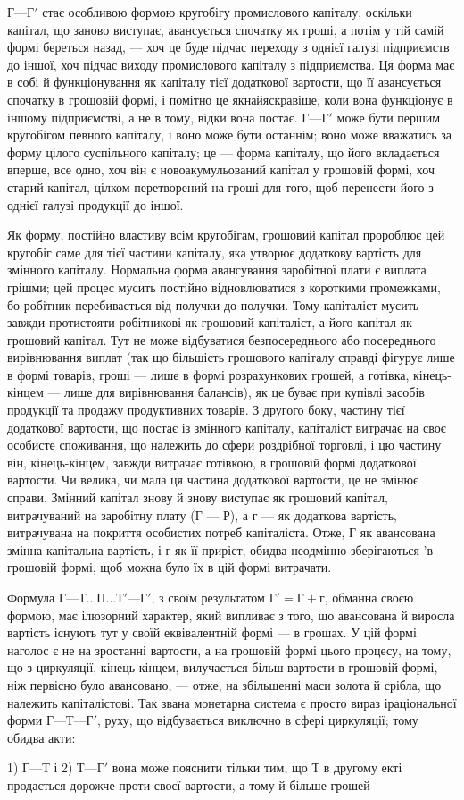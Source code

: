 $Г — Г'$ стає особливою формою кругобігу промислового капіталу,
оскільки капітал, що заново виступає, авансується спочатку як гроші, а потім
у тій самій формі береться назад, — хоч це буде підчас переходу з однієї
галузі підприємств до іншої, хоч підчас виходу промислового капіталу
з підприємства. Ця форма має в собі й функціонування як капіталу
тієї додаткової вартости, що її авансується спочатку в грошовій формі,
і помітно це якнайяскравіше, коли вона функціонує в іншому підприємстві,
а не в тому, відки вона постає. $Г — Г'$ може бути першим кругобігом
певного капіталу, і воно може бути останнім; воно може вважатись за
форму цілого суспільного капіталу; це — форма капіталу, що його вкладається
вперше, все одно, хоч він є новоакумульований капітал у грошовій
формі, хоч старий капітал, цілком перетворений на гроші для того,
щоб перенести його з однієї галузі продукції до іншої.

Як форму, постійно властиву всім кругобігам, грошовий капітал пророблює
цей кругобіг саме для тієї частини капіталу, яка утворює додаткову
вартість для змінного капіталу. Нормальна форма авансування
заробітної плати є виплата грішми; цей процес мусить постійно відновлюватися
з короткими промежками, бо робітник перебивається від
получки до получки. Тому капіталіст мусить завжди протистояти робітникові
як грошовий капіталіст, а його капітал як грошовий капітал. Тут
не може відбуватися безпосереднього або посереднього вирівнювання
виплат (так що більшість грошового капіталу справді фігурує лише
в формі товарів, гроші — лише в формі розрахункових грошей, а готівка,
кінець-кінцем — лише для вирівнювання балансів), як це буває при купівлі
засобів продукції та продажу продуктивних товарів. З другого боку,
частину тієї додаткової вартости, що постає із змінного капіталу, капіталіст
витрачає на своє особисте споживання, що належить до сфери
роздрібної торговлі, і цю частину він, кінець-кінцем, завжди витрачає
готівкою, в грошовій формі додаткової вартости. Чи велика, чи мала ця
частина додаткової вартости, це не змінює справи. Змінний капітал
знову й знову виступає як грошовий капітал, витрачуваний на заробітну
плату (Г — Р), а г — як додаткова вартість, витрачувана на покриття
особистих потреб капіталіста. Отже, Г як авансована змінна капітальна
вартість, і г як її приріст, обидва неодмінно зберігаються 'в грошовій
формі, щоб можна було їх в цій формі витрачати.

Формула $Г — Т... П... Т' — Г'$, з своїм результатом $Г' = Г + г$, обманна
своєю формою, має ілюзорний характер, який випливає з того, що
авансована й виросла вартість існують тут у своїй еквівалентній формі — в грошах. У цій формі
наголос є не на зростанні вартости, а на
грошовій формі цього процесу, на тому, що з циркуляції, кінець-кінцем,
вилучається більш вартости в грошовій формі, ніж первісно було авансовано, — отже, на збільшенні
маси золота й срібла, що належить капіталістові.
Так звана монетарна система є просто вираз іраціональної форми $Г — Т — Г'$,
руху, що відбувається виключно в сфері циркуляції; тому обидва акти:

1) $Г — Т$ і 2) $Т — Г'$ вона може пояснити тільки тим, що Т в другому
екті продається дорожче проти своєї вартости, а тому й більше грошей
\parbreak{}  %
